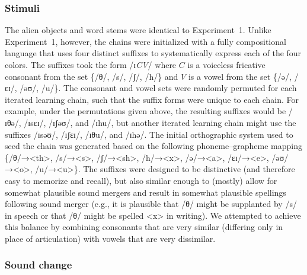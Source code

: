 \documentclass[doc,biblatex]{apa7}
\begin{document}
\subsubsection{Stimuli}

The alien objects and word stems were identical to Experiment~1. Unlike Experiment~1, however, the chains were initialized with a fully compositional language that uses four distinct suffixes to systematically express each of the four colors. The suffixes took the form /ɪ\textit{CV}/ where $C$ is a voiceless fricative consonant from the set \{/θ/, /s/, /ʃ/, /h/\} and $V$ is a vowel from the set \{/ə/, /ɛɪ/, /əʊ/, /u/\}. The consonant and vowel sets were randomly permuted for each iterated learning chain, such that the suffix forms were unique to each chain. For example, under the permutations given above, the resulting suffixes would be /ɪθə/, /ɪsɛɪ/, /ɪʃəʊ/, and /ɪhu/, but another iterated learning chain might use the suffixes /ɪsəʊ/, /ɪʃɛɪ/, /ɪθu/, and /ɪhə/. The initial orthographic system used to seed the chain was generated based on the following phoneme–grapheme mapping \{/θ/→<th>, /s/→<s>, /ʃ/→<sh>, /h/→<x>, /ə/→<a>, /ɛɪ/→<e>, /əʊ/→<o>, /u/→<u>\}. The suffixes were designed to be distinctive (and therefore easy to memorize and recall), but also similar enough to (mostly) allow for somewhat plausible sound mergers and result in somewhat plausible spellings following sound merger (e.g., it is plausible that /θ/ might be supplanted by /s/ in speech or that /θ/ might be spelled <x> in writing). We attempted to achieve this balance by combining consonants that are very similar (differing only in place of articulation) with vowels that are very dissimilar.

\subsubsection{Sound change}
\end{document}
